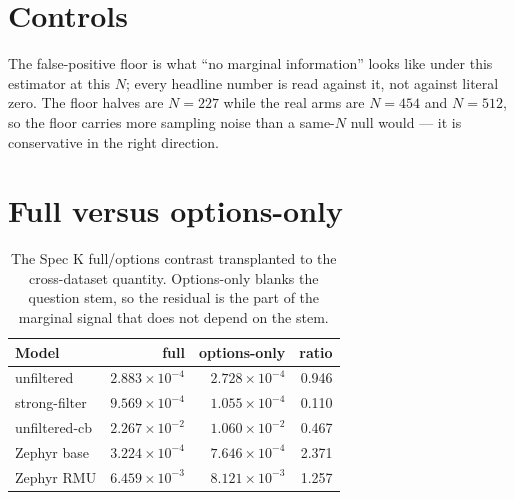 \documentclass[11pt]{article}
\begin{document}
\section{Controls}
The false-positive floor is what ``no marginal information'' looks like under this
estimator at this $N$; every headline number is read against it, not against literal zero.
The floor halves are $N=227$ while the real arms are $N=454$ and $N=512$, so the floor
carries more sampling noise than a same-$N$ null would --- it is conservative in the right
direction.
\section{Full versus options-only}
\begin{table}[h]\centering\small
\begin{tabular}{lrrr}
\toprule
Model & full & options-only & ratio\\
\midrule
unfiltered & $2.883\times10^{-4}$ & $2.728\times10^{-4}$ & 0.946\\
strong-filter & $9.569\times10^{-4}$ & $1.055\times10^{-4}$ & 0.110\\
unfiltered-cb & $2.267\times10^{-2}$ & $1.060\times10^{-2}$ & 0.467\\
Zephyr base & $3.224\times10^{-4}$ & $7.646\times10^{-4}$ & 2.371\\
Zephyr RMU & $6.459\times10^{-3}$ & $8.121\times10^{-3}$ & 1.257\\
\bottomrule\end{tabular}
\caption{The Spec K full/options contrast transplanted to the cross-dataset
quantity. Options-only blanks the question stem, so the residual is the part of the
marginal signal that does not depend on the stem.}\label{tab:options}
\end{table}
\end{document}
